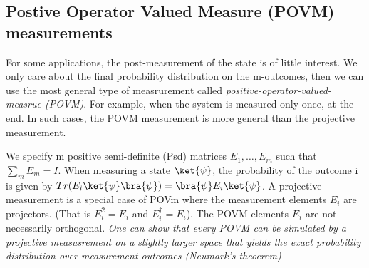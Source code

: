 \documentclass[12pt, oneside]{book}
\theoremstyle{definition}
\theoremstyle{definition}
\theoremstyle{remark}
\begin{document}
\subsection{Postive Operator Valued Measure (POVM) measurements}
For some applications, the post-measurement of the state is of little interest. We only care about the final probability distribution 
on the m-outcomes, then we can use the most general type of measrurement called \textit{positive-operator-valued-measrue (POVM)}. For example,
when the system is measured only once, at the end. In such cases, the POVM measurement is more general than the projective measurement.

We specify m positive semi-definite (Psd) matrices $E_1,\ldots,E_m$ such that $\sum_m E_m=I$. When measuring a state 
$\ket{\psi}$, the probability of the outcome i is given by $Tr(E_i\ket{\psi}\bra{\psi}) = \bra{\psi}E_i\ket{\psi}$. A projective measurement is a special case of POVm where the 
measurement elements $E_i$ are projectors. (That is $E_i^2=E_i$ and $E_i^{\dagger}=E_i$). The POVM elements $E_i$ are not necessarily orthogonal. 
\textit{One can show that every POVM can be simulated by a projective measusrement on a slightly larger space that yields the exact probability distribution over measurement outcomes (Neumark's theoerem)}
\end{document}
